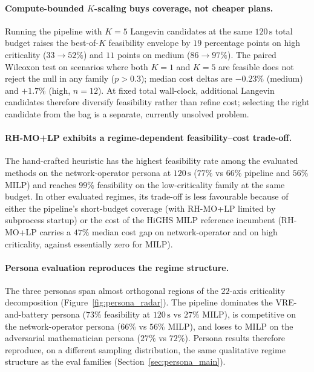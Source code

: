 \documentclass{article}
\begin{document}
\paragraph{Compute-bounded $K$-scaling buys coverage, not cheaper plans.}
Running the pipeline with $K=5$ Langevin candidates at the same $120\,\mathrm{s}$ total budget raises the best-of-$K$ feasibility envelope by $19$ percentage points on high criticality ($33 \to 52\%$) and $11$ points on medium ($86 \to 97\%$). The paired Wilcoxon test on scenarios where both $K=1$ and $K=5$ are feasible does not reject the null in any family ($p > 0.3$); median cost deltas are $-0.23\%$ (medium) and $+1.7\%$ (high, $n=12$). At fixed total wall-clock, additional Langevin candidates therefore diversify feasibility rather than refine cost; selecting the right candidate from the bag is a separate, currently unsolved problem.

\paragraph{RH-MO+LP exhibits a regime-dependent feasibility--cost trade-off.}
The hand-crafted heuristic has the highest feasibility rate among the evaluated methods on the network-operator persona at $120\,\mathrm{s}$ ($77\%$ vs $66\%$ pipeline and $56\%$ MILP) and reaches $99\%$ feasibility on the low-criticality family at the same budget. In other evaluated regimes, its trade-off is less favourable because of either the pipeline's short-budget coverage (with RH-MO+LP limited by subprocess startup) or the cost of the HiGHS MILP reference incumbent (RH-MO+LP carries a $47\%$ median cost gap on network-operator and on high criticality, against essentially zero for MILP).

\paragraph{Persona evaluation reproduces the regime structure.}
The three personas span almost orthogonal regions of the $22$-axis criticality decomposition (Figure~\ref{fig:persona_radar}). The pipeline dominates the VRE-and-battery persona ($73\%$ feasibility at $120\,\mathrm{s}$ vs $27\%$ MILP), is competitive on the network-operator persona ($66\%$ vs $56\%$ MILP), and loses to MILP on the adversarial mathematician persona ($27\%$ vs $72\%$). Persona results therefore reproduce, on a different sampling distribution, the same qualitative regime structure as the eval families (Section~\ref{sec:persona_main}).
\end{document}
